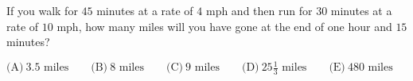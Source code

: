 

If you walk for $45$ minutes at a rate of $4 \text{ mph}$ and then run for $30$ minutes at a rate of $10\text{ mph}$, how many miles will you have gone at the end of one hour and $15$ minutes?

$\text{(A)}\ 3.5\text{ miles} \qquad \text{(B)}\ 8\text{ miles} \qquad \text{(C)}\ 9\text{ miles} \qquad \text{(D)}\ 25\frac{1}{3}\text{ miles} \qquad \text{(E)}\ 480\text{ miles}$
